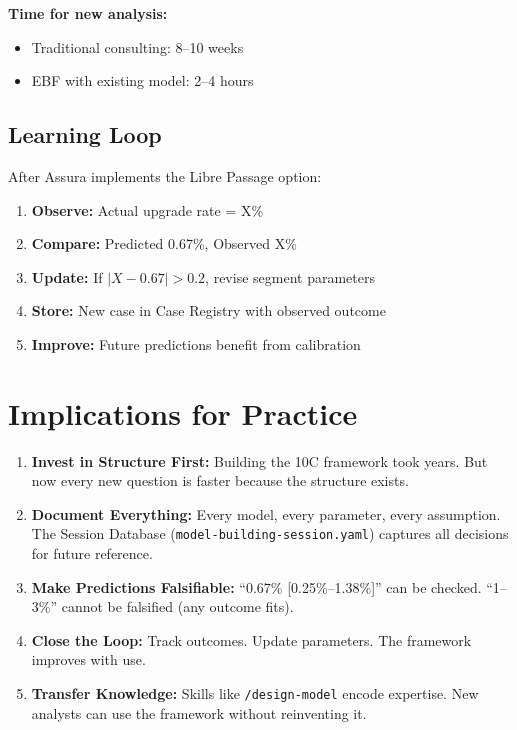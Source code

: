 \textbf{Time for new analysis:}
\begin{itemize}[nosep]
    \item Traditional consulting: 8--10 weeks
    \item EBF with existing model: 2--4 hours
\end{itemize}

\subsection{Learning Loop}

After Assura implements the Libre Passage option:
\begin{enumerate}
    \item \textbf{Observe:} Actual upgrade rate = X\%
    \item \textbf{Compare:} Predicted 0.67\%, Observed X\%
    \item \textbf{Update:} If $|X - 0.67| > 0.2$, revise segment parameters
    \item \textbf{Store:} New case in Case Registry with observed outcome
    \item \textbf{Improve:} Future predictions benefit from calibration
\end{enumerate}


\section{Implications for Practice}
\label{sec:fm-practice}

\begin{tcolorbox}[colback=green!5!white, colframe=green!75!black,
    title=Practical Implications]
\begin{enumerate}
\item \textbf{Invest in Structure First:} Building the 10C framework took years. But now every new question is faster because the structure exists.

\item \textbf{Document Everything:} Every model, every parameter, every assumption. The Session Database (\texttt{model-building-session.yaml}) captures all decisions for future reference.

\item \textbf{Make Predictions Falsifiable:} ``0.67\% [0.25\%--1.38\%]'' can be checked. ``1--3\%'' cannot be falsified (any outcome fits).

\item \textbf{Close the Loop:} Track outcomes. Update parameters. The framework improves with use.

\item \textbf{Transfer Knowledge:} Skills like \texttt{/design-model} encode expertise. New analysts can use the framework without reinventing it.
\end{enumerate}
\end{tcolorbox}


